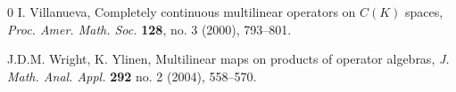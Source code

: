\documentclass[10pt]{amsart}
\begin{document}
\begin{thebibliography}{0}
		 I. Villanueva, Completely continuous multilinear operators on $C(K)$ spaces, \emph{Proc. Amer. Math. Soc.} \textbf{128}, no. 3 (2000), 793--801.
		
		
		
		
		 J.D.M. Wright, K. Ylinen, Multilinear maps on products of operator algebras, \emph{J. Math. Anal. Appl.} \textbf{292} no. 2 (2004), 558--570.
		
	\end{thebibliography}
	
	
\end{document}
